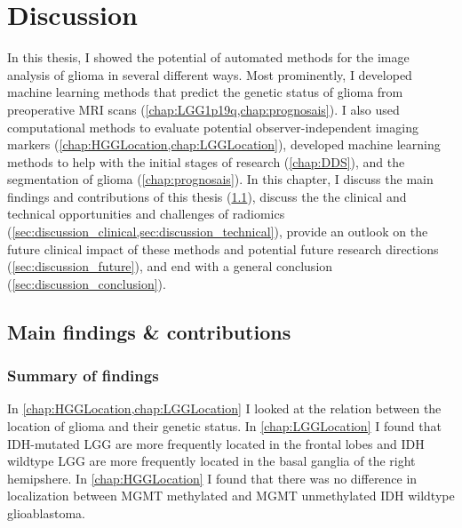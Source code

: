 
\chapter{Discussion}\label{chap:discussion}
\begin{ChapterAbstractNoTitle}
\end{ChapterAbstractNoTitle}
In this thesis, I showed the potential of automated methods for the image analysis of glioma in several different ways.
Most prominently, I developed machine learning methods that predict the genetic status of glioma from preoperative \gls{MRI} scans (\cref{chap:LGG1p19q,chap:prognosais}).
I also used computational methods to evaluate potential observer-independent imaging markers (\cref{chap:HGGLocation,chap:LGGLocation}), developed machine learning methods to help with the initial stages of research (\cref{chap:DDS}), and the segmentation of glioma (\cref{chap:prognosais}).
In this chapter, I discuss the main findings and contributions of this thesis (\cref{sec:discussion_main_findings}), discuss the the clinical and technical opportunities and challenges of radiomics (\cref{sec:discussion_clinical,sec:discussion_technical}), provide an outlook on the future clinical impact of these methods and potential future research directions (\cref{sec:discussion_future}), and end with a general conclusion (\cref{sec:discussion_conclusion}).

\section{Main findings \& contributions}\label{sec:discussion_main_findings}

\subsection{Summary of findings}

In \cref{chap:HGGLocation,chap:LGGLocation} I looked at the relation between the location of \gls{glioma} and their genetic status.
In \cref{chap:LGGLocation} I found that \gls{IDH}-mutated \gls{LGG} are more frequently located in the frontal lobes and \gls{IDH} wildtype \gls{LGG} are more frequently located in the basal ganglia of the right hemipshere.
In \cref{chap:HGGLocation} I found that there was no difference in localization between \gls{MGMT} methylated and \gls{MGMT} unmethylated \gls{IDH} wildtype glioablastoma.


